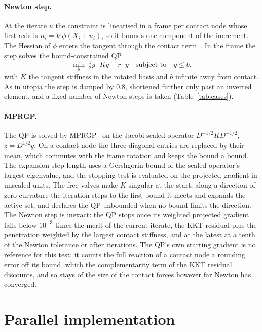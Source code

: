 \documentclass[sigconf,nonacm]{acmart}
\begin{document}
\paragraph{Newton step.} At the iterate $u$ the constraint is linearised in a frame per contact
node whose first axis is $n_i=\nabla\phi(X_i+u_i)$, so it bounds one component of the increment.
The Hessian of $\phi$ enters the tangent through the contact term~\cite{wriggers2006}. In the frame
the step solves the bound-constrained QP
\begin{equation}
  \min_{y}\ \tfrac12 y^\top K y - r^\top y \quad \text{subject to}\quad y \le b ,
\end{equation}
with $K$ the tangent stiffness in the rotated basis and $b$ infinite away from contact. As in
utopia the step is damped by $0.8$, shortened further only past an inverted element, and a fixed
number of Newton steps is taken (Table~\ref{tab:cases}).

\paragraph{MPRGP.} The QP is solved by MPRGP~\cite{dostal2005mprgp,dostal2009} on the Jacobi-scaled
operator $D^{-1/2}KD^{-1/2}$, $z=D^{1/2}y$. On a contact node the three diagonal entries are
replaced by their mean, which commutes with the frame rotation and keeps the bound a bound. The
expansion step length uses a Gershgorin bound of the scaled operator's largest eigenvalue, and
the stopping test is evaluated on the projected gradient in unscaled units. The free valves make
$K$ singular at the start; along a direction of zero curvature the iteration steps to the first
bound it meets and expands the active set, and declares the QP unbounded when no bound limits the
direction. The Newton step is inexact: the QP stops once its weighted projected gradient falls
below $10^{-3}$ times the merit of the current iterate, the KKT residual plus the penetration
weighted by the largest contact stiffness, and at the latest at a tenth of the Newton tolerance or
after \qpCap{} iterations. The QP's own starting gradient is no reference for this test: it counts
the full reaction of a contact node a rounding error off its bound, which the complementarity term
of the KKT residual discounts, and so stays of the size of the contact forces however far Newton
has converged.

\section{Parallel implementation}
\end{document}
